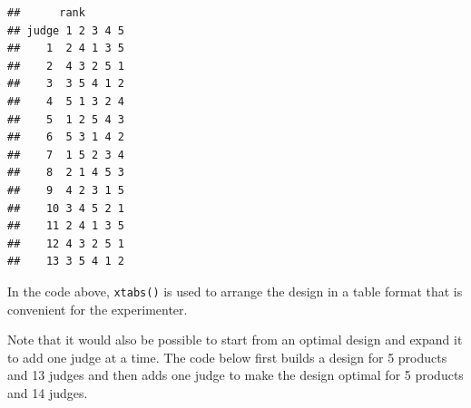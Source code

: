 \documentclass[
]{krantz}
\makeatletter
\newenvironment{Shaded}{\begin{snugshade}}{\end{snugshade}}
\newcommand{\AttributeTok}[1]{\textcolor[rgb]{0.61,0.61,0.61}{#1}}
\newcommand{\ConstantTok}[1]{\textcolor[rgb]{0,0,0}{#1}}
\newcommand{\DecValTok}[1]{\textcolor[rgb]{0.06,0.06,0.06}{#1}}
\newcommand{\FunctionTok}[1]{\textcolor[rgb]{0,0,0}{#1}}
\newcommand{\NormalTok}[1]{#1}
\newcommand{\OtherTok}[1]{\textcolor[rgb]{0.37,0.37,0.37}{#1}}
\newcommand{\SpecialCharTok}[1]{\textcolor[rgb]{0,0,0}{#1}}
\newenvironment{kframe}{%
\medskip{}
\setlength{\fboxsep}{.8em}
 \def\at@end@of@kframe{}%
 \ifinner\ifhmode%
  \def\at@end@of@kframe{\end{minipage}}%
  \begin{minipage}{\columnwidth}%
 \fi\fi%
 \def\FrameCommand##1{\hskip\@totalleftmargin \hskip-\fboxsep
 \colorbox{shadecolor}{##1}\hskip-\fboxsep
     \hskip-\linewidth \hskip-\@totalleftmargin \hskip\columnwidth}%
 \MakeFramed {\advance\hsize-\width
   \@totalleftmargin\z@ \linewidth\hsize
   \@setminipage}}%
 {\par\unskip\endMakeFramed%
 \at@end@of@kframe}
\renewenvironment{Shaded}{\begin{kframe}}{\end{kframe}}
\makeatother
\begin{document}
\begin{Shaded}
\end{Shaded}

\begin{verbatim}
##      rank
## judge 1 2 3 4 5
##    1  2 4 1 3 5
##    2  4 3 2 5 1
##    3  3 5 4 1 2
##    4  5 1 3 2 4
##    5  1 2 5 4 3
##    6  5 3 1 4 2
##    7  1 5 2 3 4
##    8  2 1 4 5 3
##    9  4 2 3 1 5
##    10 3 4 5 2 1
##    11 2 4 1 3 5
##    12 4 3 2 5 1
##    13 3 5 4 1 2
\end{verbatim}

In the code above, \texttt{xtabs()} is used to arrange the design in a table format that is convenient for the experimenter.

Note that it would also be possible to start from an optimal design and expand it to add one judge at a time. The code below first builds a design for 5 products and 13 judges and then adds one judge to make the design optimal for 5 products and 14 judges.
\end{document}
